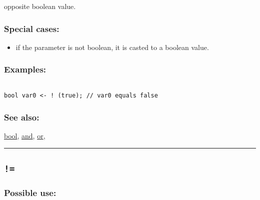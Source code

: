 \documentclass[]{book}
\providecommand{\tightlist}{%
  \setlength{\itemsep}{0pt}\setlength{\parskip}{0pt}}
\theoremstyle{definition}
\theoremstyle{definition}
\theoremstyle{definition}
\theoremstyle{remark}
\begin{document}
opposite boolean value.

\subsubsection{Special cases:}\label{special-cases-2}

\begin{itemize}
\tightlist
\item
  if the parameter is not boolean, it is casted to a boolean value.
\end{itemize}

\subsubsection{Examples:}\label{examples-1}

\begin{verbatim}
 
bool var0 <- ! (true); // var0 equals false
\end{verbatim}

\subsubsection{See also:}\label{see-also-2}

\href{OperatorsBC\#bool}{bool}, \href{OperatorsAA\#and}{and},
\href{OperatorsNR\#or}{or},

\begin{center}\rule{0.5\linewidth}{\linethickness}\end{center}

\subsection{\texorpdfstring{\texttt{!=}}{!=}}\label{section-5}

\subsubsection{Possible use:}\label{possible-use-4}
\end{document}

